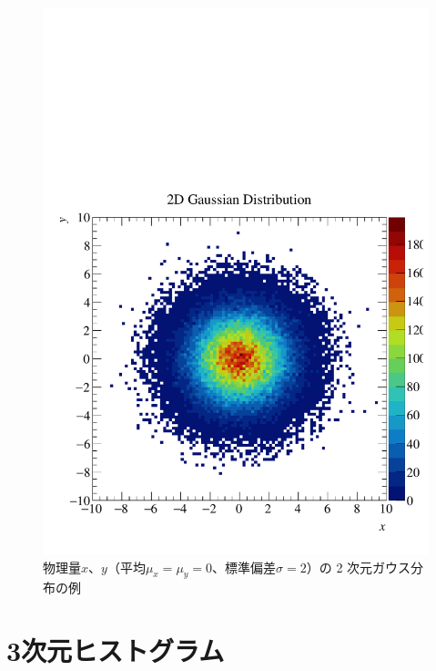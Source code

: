 \begin{figure}
  \centering
  \includegraphics[width=12cm]{fig/TH2D.pdf}
  \caption{物理量$x$、$y$（平均$\mu_x = \mu_y = 0$、標準偏差$\sigma = 2$）の 2 次元ガウス分布の例}
  \label{fig:TH2D_pdf}
\end{figure}

\section{3次元ヒストグラム}

